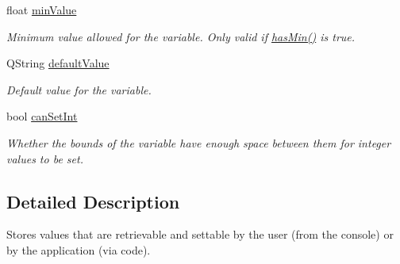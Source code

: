 \begin{DoxyCompactItemize}
float \hyperlink{class_con_var_a6c1a10a39a46f2dcb03a0a2c8d840e7a}{min\-Value}
\begin{DoxyCompactList}\small\item\em Minimum value allowed for the variable. Only valid if \hyperlink{class_con_var_a047d4105baf54cb783602456e0947196}{has\-Min()} is true. \end{DoxyCompactList}\item 
Q\-String \hyperlink{class_con_var_a6c9dacfaf9130a2d3f971f8b67af3dfc}{default\-Value}
\begin{DoxyCompactList}\small\item\em Default value for the variable. \end{DoxyCompactList}\item 
bool \hyperlink{class_con_var_a9fe17f8e6afc6b9fa6b69136b51b070f}{can\-Set\-Int}
\begin{DoxyCompactList}\small\item\em Whether the bounds of the variable have enough space between them for integer values to be set. \end{DoxyCompactList}\end{DoxyCompactItemize}


\subsection{Detailed Description}
Stores values that are retrievable and settable by the user (from the console) or by the application (via code). 

